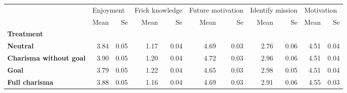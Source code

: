 \begin{tabular}{lrrrrrrrrrr}
\toprule
{} & \multicolumn{2}{l}{Enjoyment} & \multicolumn{2}{l}{Frick knowledge} & \multicolumn{2}{l}{Future motivation} & \multicolumn{2}{l}{Identify mission} & \multicolumn{2}{l}{Motivation} \\
{} &      Mean &   Se &            Mean &   Se &              Mean &   Se &             Mean &   Se &       Mean &   Se \\
\textbf{Treatment            } &           &      &                 &      &                   &      &                  &      &            &      \\
\midrule
\textbf{Neutral              } &      3.84 & 0.05 &            1.17 & 0.04 &              4.69 & 0.03 &             2.76 & 0.06 &       4.51 & 0.04 \\
\textbf{Charisma without goal} &      3.90 & 0.05 &            1.20 & 0.04 &              4.72 & 0.03 &             2.96 & 0.06 &       4.51 & 0.04 \\
\textbf{Goal                 } &      3.79 & 0.05 &            1.22 & 0.04 &              4.65 & 0.03 &             2.98 & 0.05 &       4.51 & 0.04 \\
\textbf{Full charisma        } &      3.88 & 0.05 &            1.16 & 0.04 &              4.69 & 0.03 &             2.91 & 0.06 &       4.55 & 0.03 \\
\bottomrule
\end{tabular}
